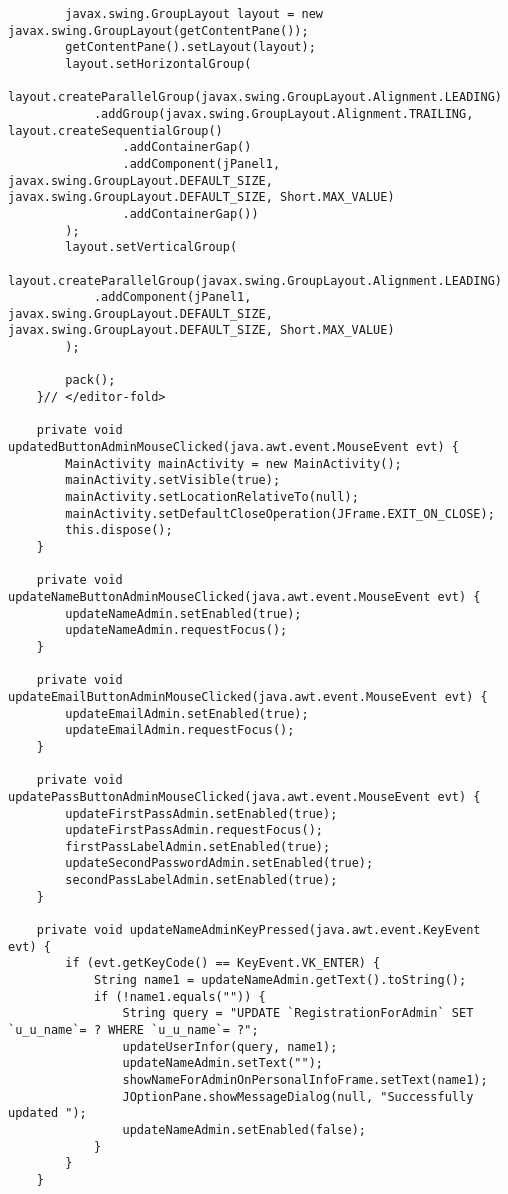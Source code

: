 \documentclass[12pt,a4paper]{article}
\begin{document}
\begin{lstlisting}
        javax.swing.GroupLayout layout = new javax.swing.GroupLayout(getContentPane());
        getContentPane().setLayout(layout);
        layout.setHorizontalGroup(
            layout.createParallelGroup(javax.swing.GroupLayout.Alignment.LEADING)
            .addGroup(javax.swing.GroupLayout.Alignment.TRAILING, layout.createSequentialGroup()
                .addContainerGap()
                .addComponent(jPanel1, javax.swing.GroupLayout.DEFAULT_SIZE, javax.swing.GroupLayout.DEFAULT_SIZE, Short.MAX_VALUE)
                .addContainerGap())
        );
        layout.setVerticalGroup(
            layout.createParallelGroup(javax.swing.GroupLayout.Alignment.LEADING)
            .addComponent(jPanel1, javax.swing.GroupLayout.DEFAULT_SIZE, javax.swing.GroupLayout.DEFAULT_SIZE, Short.MAX_VALUE)
        );

        pack();
    }// </editor-fold>                        

    private void updatedButtonAdminMouseClicked(java.awt.event.MouseEvent evt) {                                                
        MainActivity mainActivity = new MainActivity();
        mainActivity.setVisible(true);
        mainActivity.setLocationRelativeTo(null);
        mainActivity.setDefaultCloseOperation(JFrame.EXIT_ON_CLOSE);
        this.dispose();
    }                                               

    private void updateNameButtonAdminMouseClicked(java.awt.event.MouseEvent evt) {                                                   
        updateNameAdmin.setEnabled(true);
        updateNameAdmin.requestFocus();
    }                                                  

    private void updateEmailButtonAdminMouseClicked(java.awt.event.MouseEvent evt) {                                                    
        updateEmailAdmin.setEnabled(true);
        updateEmailAdmin.requestFocus();
    }                                                   

    private void updatePassButtonAdminMouseClicked(java.awt.event.MouseEvent evt) {                                                   
        updateFirstPassAdmin.setEnabled(true);
        updateFirstPassAdmin.requestFocus();
        firstPassLabelAdmin.setEnabled(true);
        updateSecondPasswordAdmin.setEnabled(true);
        secondPassLabelAdmin.setEnabled(true);
    }                                                  

    private void updateNameAdminKeyPressed(java.awt.event.KeyEvent evt) {                                           
        if (evt.getKeyCode() == KeyEvent.VK_ENTER) {
            String name1 = updateNameAdmin.getText().toString();
            if (!name1.equals("")) {
                String query = "UPDATE `RegistrationForAdmin` SET `u_u_name`= ? WHERE `u_u_name`= ?";
                updateUserInfor(query, name1);
                updateNameAdmin.setText("");
                showNameForAdminOnPersonalInfoFrame.setText(name1);
                JOptionPane.showMessageDialog(null, "Successfully updated ");
                updateNameAdmin.setEnabled(false);
            }
        }
    }                                          


\end{lstlisting}
\end{document}
